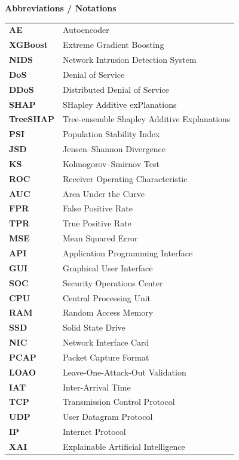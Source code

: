 \documentclass[12pt,a4paper]{report}
\begin{document}
\begin{center}
{\Large\bfseries Abbreviations / Notations}\\[0.6cm]
\end{center}

\noindent
\begin{tabularx}{\textwidth}{p{3.2cm} X}
\textbf{AE} & Autoencoder \\
\textbf{XGBoost} & Extreme Gradient Boosting \\
\textbf{NIDS} & Network Intrusion Detection System \\
\textbf{DoS} & Denial of Service \\
\textbf{DDoS} & Distributed Denial of Service \\
\textbf{SHAP} & SHapley Additive exPlanations \\
\textbf{TreeSHAP} & Tree-ensemble Shapley Additive Explanations \\
\textbf{PSI} & Population Stability Index \\
\textbf{JSD} & Jensen--Shannon Divergence \\
\textbf{KS} & Kolmogorov--Smirnov Test \\
\textbf{ROC} & Receiver Operating Characteristic \\
\textbf{AUC} & Area Under the Curve \\
\textbf{FPR} & False Positive Rate \\
\textbf{TPR} & True Positive Rate \\
\textbf{MSE} & Mean Squared Error \\
\textbf{API} & Application Programming Interface \\
\textbf{GUI} & Graphical User Interface \\
\textbf{SOC} & Security Operations Center \\
\textbf{CPU} & Central Processing Unit \\
\textbf{RAM} & Random Access Memory \\
\textbf{SSD} & Solid State Drive \\
\textbf{NIC} & Network Interface Card \\
\textbf{PCAP} & Packet Capture Format \\
\textbf{LOAO} & Leave-One-Attack-Out Validation \\
\textbf{IAT} & Inter-Arrival Time \\
\textbf{TCP} & Transmission Control Protocol \\
\textbf{UDP} & User Datagram Protocol \\
\textbf{IP} & Internet Protocol \\
\textbf{XAI} & Explainable Artificial Intelligence \\
\end{tabularx}
\end{document}
